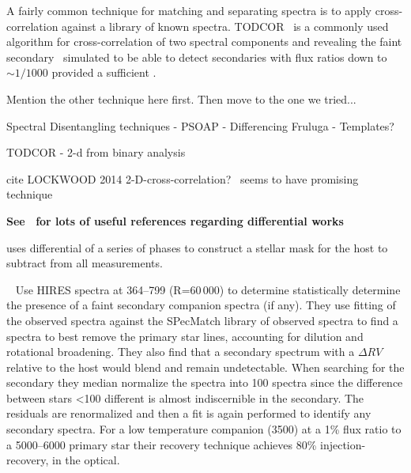 

A fairly common technique for matching and separating spectra is to apply cross-correlation against a library of known spectra.
TODCOR~\citep{zucker_study_1994} is a commonly used algorithm for cross-correlation of two spectral components and revealing the faint secondary~\citep[e.g.][]{mazeh_detecting_1997} simulated to be able to detect secondaries with flux ratios down to \(\sim1/1000\) provided a sufficient \snr{}\citep{mazeh_todocr_1994}.

Mention the other technique here first.
Then move to the one we tried...

Spectral Disentangling techniques
- PSOAP \citet{czekala_disentangling_2017} 
- Differencing Fruluga
- Templates?

TODCOR - 2-d from binary analysis~\citep{zucker_study_1994}
\citep{mazeh_detecting_1997}


cite {LOCKWOOD 2014}
2-D-cross-correlation?~\citet{piskorz_evidence_2016} seems to have promising technique


\textbf{
    See~\citet{kostogryz_spectral_2013} for lots of useful references regarding differential works~\citet{simon_disentangling_1994}}

\citet{rodler_weighing_2012} uses differential of a series of phases to construct a stellar mask for the host to subtract from all measurements.


{\red{}~\citet{kolbl_detection_2015} Use HIRES spectra at 364--799\nm{} (R=60\,000) to determine statistically determine the presence of a faint secondary companion spectra (if any).
    They use \textchisquared{} fitting of the observed spectra against the {SPecMatch} library of observed spectra to find a spectra to best remove the primary star lines,
    accounting for dilution and rotational broadening.
    They also find that a secondary spectrum with a \(\Delta {RV}\) relative to the host would blend and remain undetectable.
    When searching for the secondary they median normalize the spectra into 100\K{} spectra since the difference between stars  <100\K{} different is almost indiscernible in the secondary.
    The residuals are renormalized and then a \textchisquared{} fit is again performed to identify any secondary spectra.
    For a low temperature companion (3500\K{}) at a 1\% flux ratio to a 5000--6000\K{} primary star their recovery technique achieves 80\% injection-recovery, in the optical.}


